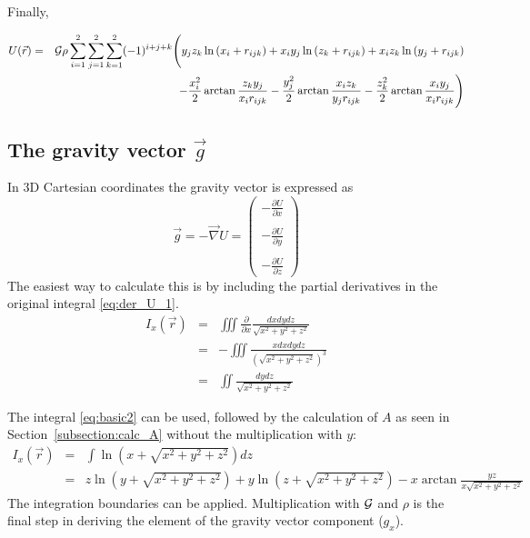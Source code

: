 Finally,
\begin{mdframed}[backgroundcolor=blue!5]
\begin{eqnarray}
U(\vec{r}) &=& {\cal G}  \rho 
\sum_{i=1}^{2} \sum_{j=1}^{2} \sum_{k=1}^{2} (-1)^{i+j+k} \Bigg( 
y_j z_k \ln{\left( x_i + r_{ijk} \right)} + 
x_i y_j \ln{\left( z_k + r_{ijk} \right)} + 
x_i z_k \ln{\left( y_j+r_{ijk} \right)}   \nonumber\\ 
&&  \qquad \qquad - 
\frac{x_i^2}{2} \arctan{\frac{z_k y_j}{x_i r_{ijk}}} - 
\frac{y_j^2}{2} \arctan{\frac{x_i z_k}{y_j r_{ijk}}} - 
\frac{z_k^2}{2} \arctan{\frac{x_i y_j}{x_i r_{ijk}}} 
\Bigg) 
\end{eqnarray}
\end{mdframed}








\subsection{The gravity vector $\vec{g}$}

In 3D Cartesian coordinates the gravity vector is expressed as
\begin{equation}
\vec{g} = -\vec\nabla U  = 
\left( 
\begin{array}{c} 
-\frac{\partial U}{\partial x} \\ \\
-\frac{\partial U}{\partial y} \\ \\
-\frac{\partial U}{\partial z} 
\end{array} \right)
\end{equation}
The easiest way to calculate this is by including the partial derivatives in the original integral \eqref{eq:der_U_1}.
\begin{eqnarray}
I_x(\vec{r}) 
&=& \iiint \frac{\partial}{\partial x} \frac{dx dy dz}{\sqrt{x^2+y^2+z^2}} \nonumber\\
&=& -\iiint \frac{x dx dy dz}{(\sqrt{x^2+y^2+z^2})^3} \nonumber\\
&=& \iint \frac{dy dz}{\sqrt{x^2+y^2+z^2}}
\end{eqnarray}

The integral \eqref{eq:basic2} can be used, followed by the calculation of $A$ as seen in Section~\ref{subsection:calc_A} 
without the multiplication with $y$:
\begin{eqnarray}
I_x(\vec{r})
&=& \int \ln{\left( x + \sqrt{x^2+y^2+z^2} \right)} dz \nonumber\\
&=& 
z \ln{\left( y + \sqrt{x^2+y^2+z^2} \right)} + 
y \ln{\left( z + \sqrt{x^2+y^2+z^2} \right)} - 
x \arctan{\frac{yz}{x \sqrt{x^2+y^2+z^2}}}
\end{eqnarray}
The integration boundaries can be applied. Multiplication with ${\cal G}$ and $\rho$ is the final step in deriving the element of 
the gravity vector component ($g_x$). 

